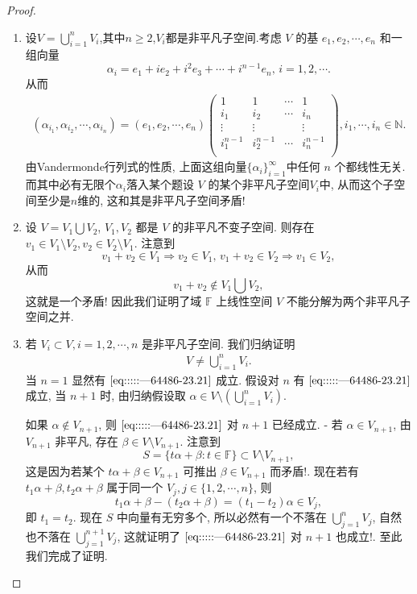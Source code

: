 \documentclass[../../main.tex]{subfiles}
\begin{document}
\begin{proof}
\begin{enumerate}
\item 设$V=\bigcup_{i=1}^n{V_i}$,其中$n\geqslant 2$,$V_i$都是非平凡子空间.考虑 \( V \) 的基 \( e_1, e_2, \cdots, e_n \) 和一组向量  
\[
\alpha_i = e_1 + i e_2 + i^2 e_3 + \cdots + i^{n-1} e_n, \, i = 1, 2, \cdots.
\] 
从而
\begin{align*}
\left( \alpha _{i_1},\alpha _{i_2},\cdots ,\alpha _{i_n} \right) =\left( e_1,e_2,\cdots ,e_n \right) \left( \begin{matrix}
1&		1&		\cdots&		1\\
i_1&		i_2&		\cdots&		i_n\\
\vdots&		\vdots&		&		\vdots\\
i_{1}^{n-1}&		i_{2}^{n-1}&		\cdots&		i_{n}^{n-1}\\
\end{matrix} \right) ,i_1,\cdots ,i_n\in \mathbb{N} .
\end{align*}
由Vandermonde行列式的性质, 上面这组向量$\{\alpha_i\}_{i=1}^{\infty}$中任何 \( n \) 个都线性无关. 而其中必有无限个$\alpha_i$落入某个题设 \( V \) 的某个非平凡子空间$V_i$中, 从而这个子空间至少是\( n \)维的, 这和其是非平凡子空间矛盾!  

\item 设 \( V = V_1 \bigcup V_2 \), \( V_1, V_2 \) 都是 \( V \) 的非平凡不变子空间. 则存在 \( v_1 \in V_1 \setminus V_2, v_2 \in V_2 \setminus V_1 \). 注意到
\[
v_1 + v_2 \in V_1 \Rightarrow v_2 \in V_1, \, v_1 + v_2 \in V_2 \Rightarrow v_1 \in V_2,
\]  
从而  
\[
v_1 + v_2 \notin V_1 \bigcup V_2,
\]  
这就是一个矛盾! 因此我们证明了域 \( \mathbb{F} \) 上线性空间 \( V \) 不能分解为两个非平凡子空间之并.  

\item 若 \( V_i \subset V, i = 1, 2, \cdots, n \) 是非平凡子空间. 我们归纳证明  
\begin{align}
V \neq \bigcup_{i=1}^n V_i. \label{eq:::::---64486-23.21}
\end{align}
当 \( n = 1 \) 显然有 \(\eqref{eq:::::---64486-23.21}\) 成立. 假设对 \( n \) 有 \(\eqref{eq:::::---64486-23.21}\) 成立, 当 \( n + 1 \) 时, 由归纳假设取 \( \alpha \in V \setminus \left( \bigcup_{i=1}^n V_i \right) \).  

如果 \( \alpha \notin V_{n+1} \), 则 \(\eqref{eq:::::---64486-23.21}\) 对 \( n + 1 \) 已经成立.  
- 若 \( \alpha \in V_{n+1} \), 由 \( V_{n+1} \) 非平凡, 存在 \( \beta \in V \setminus V_{n+1} \). 注意到  
\[
S = \{ t\alpha + \beta : t \in \mathbb{F} \} \subset V \setminus V_{n+1},
\]  
这是因为若某个 \( t\alpha + \beta \in V_{n+1} \) 可推出 \( \beta \in V_{n+1} \) 而矛盾!. 现在若有 \( t_1\alpha + \beta, t_2\alpha + \beta \) 属于同一个 \( V_j, j \in \{1, 2, \cdots, n\} \), 则  
\[
t_1\alpha + \beta - (t_2\alpha + \beta) = (t_1 - t_2) \alpha \in V_j,
\]  
即 \( t_1 = t_2 \). 现在 \( S \) 中向量有无穷多个, 所以必然有一个不落在 \( \bigcup_{j=1}^n V_j \), 自然也不落在 \( \bigcup_{j=1}^{n+1} V_j \), 这就证明了 \(\eqref{eq:::::---64486-23.21}\) 对 \( n + 1 \) 也成立!.  
至此我们完成了证明.
\end{enumerate}

\end{proof}
\end{document}
